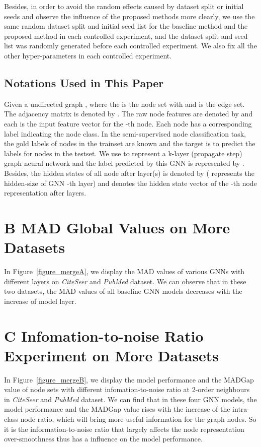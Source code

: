 \documentclass[letterpaper]{article} \usepackage{aaai20}  \usepackage{times}  \usepackage{helvet} \usepackage{courier}  \usepackage[hyphens]{url}  \usepackage{graphicx} \urlstyle{rm} \def\UrlFont{\rm}  \frenchspacing  \setlength{\pdfpagewidth}{8.5in}  \setlength{\pdfpageheight}{11in}  \setcounter{secnumdepth}{0}
\begin{document}
Besides, in order to avoid the random effects caused by dataset split or initial seeds and observe the influence of the proposed methods more clearly, we use the same random dataset split and initial seed list for the baseline method and the proposed method in each controlled experiment, and the dataset split and seed list was randomly generated before each controlled experiment. We also fix all the other hyper-parameters in each controlled experiment. 

\subsection{Notations Used in This Paper}
Given a undirected graph , where the  is the node set with  and  is the edge set. 
The adjacency matrix is denoted by . The raw node features are denoted by  and each  is the input feature vector for the -th node. 
Each node has a corresponding label  indicating the node class. In the semi-supervised node classification task, the gold labels of nodes in the trainset are known and the target is to predict the labels for nodes in the testset.
We use  to represent a k-layer (propagate step) graph neural network and the label predicted by this GNN is represented by . Besides, the hidden states of all node after  layer(s) is denoted by  ( represents the hidden-size of GNN -th layer) and  denotes the hidden state vector of the -th node representation after  layers.

\section{B MAD Global Values on More Datasets }
In Figure~\ref{figure_mergeA}, we display the MAD values of various GNNs with different layers on \textit{CiteSeer} and \textit{PubMed} dataset. We can observe that in these two datasets, the MAD values of all baseline GNN models decreases with the increase of model layer.

\section{C Infomation-to-noise Ratio Experiment on More Datasets }
In Figure~\ref{figure_mergeB}, we display the model performance and the MADGap value of node sets with different infomation-to-noise ratio at 2-order neighbours in \textit{CiteSeer} and \textit{PubMed} dataset. We can find that in these four GNN models, the model performance and the MADGap value rises
with the increase of the intra-class node ratio, which will bring more useful information for the graph nodes. So it is the information-to-noise ratio that largely affects the node representation over-smoothness thus has a influence on the model performance.
\end{document}
